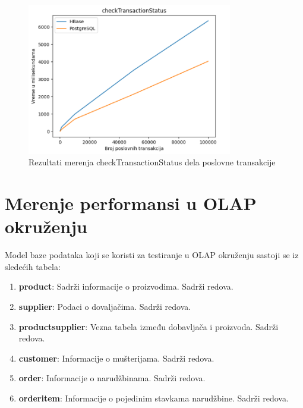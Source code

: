 \documentclass[12pt,oneside]{memoir}
\begin{document}
\begin{figure}[!ht]
  \centering
  \includegraphics[width=0.8\textwidth]{checkTransactionStatus-vizualization.png}
  \caption{Rezultati merenja checkTransactionStatus dela poslovne transakcije}
  \label{fig:grafikon}
\end{figure}

\pagebreak

\section{Merenje performansi u OLAP okruženju}

Model baze podataka koji se koristi za testiranje u OLAP okruženju  sastoji se iz sledećih tabela:

\begin{enumerate}
\item[\textbullet] \textbf{product}: {
	Sadrži informacije o proizvodima. Sadrži  redova.
}
\item[\textbullet] \textbf{supplier}:{
	Podaci o dovaljačima. Sadrži   redova.
}
\item[\textbullet] \textbf{productsupplier}:{
	Vezna tabela između dobavljača i proizvoda. Sadrži   redova.
}
\item[\textbullet] \textbf{customer}:{
	Informacije o mušterijama. Sadrži   redova.
}
\item[\textbullet] \textbf{order}:{
	Informacije o narudžbinama. Sadrži   redova.
}
\item[\textbullet] \textbf{orderitem}:{
	Informacije o pojedinim stavkama narudžbine. Sadrži   redova.
}
\end{enumerate}
\end{document}
